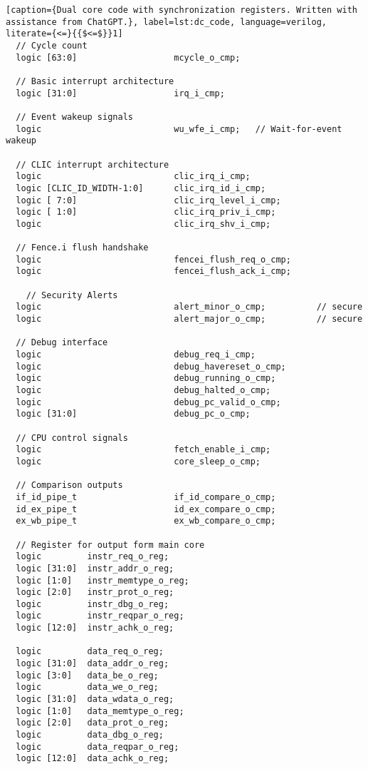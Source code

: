 \begin{lstlisting}[caption={Dual core code with synchronization registers. Written with assistance from ChatGPT.}, label=lst:dc_code, language=verilog, literate={<=}{{$<=$}}1]
  // Cycle count
  logic [63:0]                   mcycle_o_cmp;

  // Basic interrupt architecture
  logic [31:0]                   irq_i_cmp;

  // Event wakeup signals
  logic                          wu_wfe_i_cmp;   // Wait-for-event wakeup

  // CLIC interrupt architecture
  logic                          clic_irq_i_cmp;
  logic [CLIC_ID_WIDTH-1:0]      clic_irq_id_i_cmp;
  logic [ 7:0]                   clic_irq_level_i_cmp;
  logic [ 1:0]                   clic_irq_priv_i_cmp;
  logic                          clic_irq_shv_i_cmp;

  // Fence.i flush handshake
  logic                          fencei_flush_req_o_cmp;
  logic                          fencei_flush_ack_i_cmp;

    // Security Alerts
  logic                          alert_minor_o_cmp;          // secure
  logic                          alert_major_o_cmp;          // secure

  // Debug interface
  logic                          debug_req_i_cmp;
  logic                          debug_havereset_o_cmp;
  logic                          debug_running_o_cmp;
  logic                          debug_halted_o_cmp;
  logic                          debug_pc_valid_o_cmp;
  logic [31:0]                   debug_pc_o_cmp;

  // CPU control signals
  logic                          fetch_enable_i_cmp;
  logic                          core_sleep_o_cmp;

  // Comparison outputs 
  if_id_pipe_t                   if_id_compare_o_cmp;
  id_ex_pipe_t                   id_ex_compare_o_cmp;
  ex_wb_pipe_t                   ex_wb_compare_o_cmp;

  // Register for output form main core
  logic         instr_req_o_reg;         
  logic [31:0]  instr_addr_o_reg;        
  logic [1:0]   instr_memtype_o_reg;     
  logic [2:0]   instr_prot_o_reg;        
  logic         instr_dbg_o_reg;         
  logic         instr_reqpar_o_reg;      
  logic [12:0]  instr_achk_o_reg;        

  logic         data_req_o_reg;          
  logic [31:0]  data_addr_o_reg;         
  logic [3:0]   data_be_o_reg;           
  logic         data_we_o_reg;           
  logic [31:0]  data_wdata_o_reg;        
  logic [1:0]   data_memtype_o_reg;      
  logic [2:0]   data_prot_o_reg;           
  logic         data_dbg_o_reg;          
  logic         data_reqpar_o_reg;       
  logic [12:0]  data_achk_o_reg;       


\end{lstlisting}

